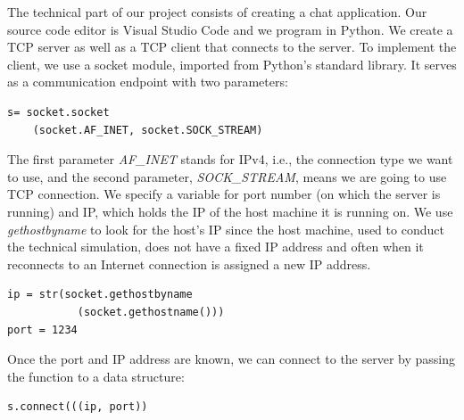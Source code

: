 The technical part of our project consists of creating a chat application. Our source code editor is Visual Studio Code and we program in Python. We create a TCP server as well as a TCP client that connects to the server. 
To implement the client, we use a socket module, imported from Python's standard library. It serves as a communication endpoint with two parameters:
\begin{verbatim}
s= socket.socket
    (socket.AF_INET, socket.SOCK_STREAM)
\end{verbatim}
The first parameter \textit{AF\_INET} stands for IPv4, i.e., the connection type we want to use, and the second parameter, \textit{SOCK\_STREAM}, means we are going to use TCP connection. We specify a variable for port number (on which the server is running) and IP, which holds the IP of the host machine it is running on. We use \textit{gethostbyname} to look for the host’s IP since the host machine, used to conduct the technical simulation, does not have a fixed IP address and often when it reconnects to an Internet connection is assigned a new IP address.
\begin{verbatim}
ip = str(socket.gethostbyname
           (socket.gethostname()))
port = 1234
\end{verbatim}
Once the port and IP address are known, we can connect to the server by passing the function to a data structure:
\begin{verbatim}
s.connect(((ip, port))
\end{verbatim}

